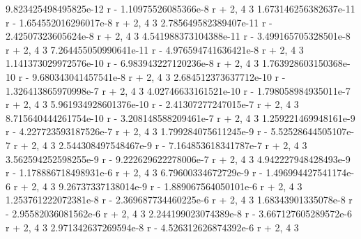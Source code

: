 \documentclass[12pt,arial,letterpaper]{book}
\begin{document}
\begin{eulercomment}
\begin{eulercomment}
\begin{eulercomment}
\begin{eulercomment}
\begin{eulercomment}
\begin{eulercomment}
\begin{eulercomment}
\begin{eulercomment}
\begin{eulercomment}
\begin{eulercomment}
\begin{eulercomment}
\begin{eulercomment}
\begin{eulercomment}
\begin{eulercomment}
\begin{eulercomment}
\begin{eulercomment}
\begin{eulercomment}
\begin{eulercomment}
\begin{eulercomment}
\begin{eulercomment}
\begin{eulercomment}
\begin{eulercomment}
\begin{euleroutput}
  9.823425498495825e-12 r  - 1.10975526085366e-8 r  + 2, 
                         4                         3
  1.673146256382637e-11 r  - 1.654552016296017e-8 r  + 2, 
                         4                        3
  2.785649582389407e-11 r  - 2.42507323605624e-8 r  + 2, 
                         4                         3
  4.541988373104388e-11 r  - 3.499165705328501e-8 r  + 2, 
                         4                         3
  7.264455050990641e-11 r  - 4.976594741636421e-8 r  + 2, 
                         4                         3
  1.141373029972576e-10 r  - 6.983943227120236e-8 r  + 2, 
                         4                         3
  1.763928603150368e-10 r  - 9.680343041457541e-8 r  + 2, 
                         4                         3
  2.684512373637712e-10 r  - 1.326413865970998e-7 r  + 2, 
                        4                         3
  4.02746633161521e-10 r  - 1.798058984935011e-7 r  + 2, 
                         4                        3
  5.961934928601376e-10 r  - 2.41307277247015e-7 r  + 2, 
                         4                         3
  8.715640444261754e-10 r  - 3.208148588209461e-7 r  + 2, 
                        4                         3
  1.259221469948161e-9 r  - 4.227723593187526e-7 r  + 2, 
                        4                        3
  1.799284075611245e-9 r  - 5.52528644505107e-7 r  + 2, 
                        4                         3
  2.544308497548467e-9 r  - 7.164853618341787e-7 r  + 2, 
                        4                         3
  3.562594252598255e-9 r  - 9.222629622278006e-7 r  + 2, 
                        4                         3
  4.942227948428493e-9 r  - 1.178886718498931e-6 r  + 2, 
                       4                         3
  6.79600334672729e-9 r  - 1.496994427541174e-6 r  + 2, 
                       4                         3
  9.26737337138014e-9 r  - 1.889067564050101e-6 r  + 2, 
                        4                         3
  1.253761222072381e-8 r  - 2.369687734460225e-6 r  + 2, 
                       4                        3
  1.68343901335078e-8 r  - 2.95582036081562e-6 r  + 2, 
                        4                         3
  2.244199023074389e-8 r  - 3.667127605289572e-6 r  + 2, 
                        4                         3
  2.971342637269594e-8 r  - 4.526312626874392e-6 r  + 2, 
                        4                         3

\end{euleroutput}
\end{eulercomment}
\end{eulercomment}
\end{eulercomment}
\end{eulercomment}
\end{eulercomment}
\end{eulercomment}
\end{eulercomment}
\end{eulercomment}
\end{eulercomment}
\end{eulercomment}
\end{eulercomment}
\end{eulercomment}
\end{eulercomment}
\end{eulercomment}
\end{eulercomment}
\end{eulercomment}
\end{eulercomment}
\end{eulercomment}
\end{eulercomment}
\end{eulercomment}
\end{eulercomment}
\end{eulercomment}
\end{document}
